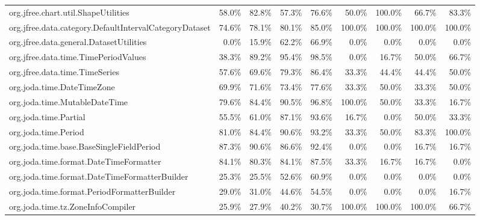 \begin{tabular}{ l rrrr rrrr}
org.jfree.chart.util.ShapeUtilities &  58.0\% &  82.8\% &  57.3\% &  76.6\% &  50.0\% &  100.0\% &  66.7\% &  83.3\%\\ 
org.jfree.data.category.DefaultIntervalCategoryDataset &  74.6\% &  78.1\% &  80.1\% &  85.0\% &  100.0\% &  100.0\% &  100.0\% &  100.0\%\\ 
org.jfree.data.general.DatasetUtilities &  0.0\% &  15.9\% &  62.2\% &  66.9\% &  0.0\% &  0.0\% &  0.0\% &  0.0\%\\ 
org.jfree.data.time.TimePeriodValues &  38.3\% &  89.2\% &  95.4\% &  98.5\% &  0.0\% &  16.7\% &  50.0\% &  66.7\%\\ 
org.jfree.data.time.TimeSeries &  57.6\% &  69.6\% &  79.3\% &  86.4\% &  33.3\% &  44.4\% &  44.4\% &  50.0\%\\ 
org.joda.time.DateTimeZone &  69.9\% &  71.6\% &  73.4\% &  77.6\% &  33.3\% &  50.0\% &  33.3\% &  50.0\%\\ 
org.joda.time.MutableDateTime &  79.6\% &  84.4\% &  90.5\% &  96.8\% &  100.0\% &  50.0\% &  33.3\% &  16.7\%\\ 
org.joda.time.Partial &  55.5\% &  61.0\% &  87.1\% &  93.6\% &  16.7\% &  0.0\% &  50.0\% &  33.3\%\\ 
org.joda.time.Period &  81.0\% &  84.4\% &  90.6\% &  93.2\% &  33.3\% &  50.0\% &  83.3\% &  100.0\%\\ 
org.joda.time.base.BaseSingleFieldPeriod &  87.3\% &  90.6\% &  86.6\% &  92.4\% &  0.0\% &  0.0\% &  16.7\% &  16.7\%\\ 
org.joda.time.format.DateTimeFormatter &  84.1\% &  80.3\% &  84.1\% &  87.5\% &  33.3\% &  16.7\% &  16.7\% &  0.0\%\\ 
org.joda.time.format.DateTimeFormatterBuilder &  25.3\% &  25.5\% &  52.6\% &  60.9\% &  0.0\% &  0.0\% &  0.0\% &  0.0\%\\ 
org.joda.time.format.PeriodFormatterBuilder &  29.0\% &  31.0\% &  44.6\% &  54.5\% &  0.0\% &  0.0\% &  0.0\% &  16.7\%\\ 
org.joda.time.tz.ZoneInfoCompiler &  25.9\% &  27.9\% &  40.2\% &  30.7\% &  100.0\% &  100.0\% &  100.0\% &  66.7\%\\ 
\bottomrule 
\end{tabular} 
